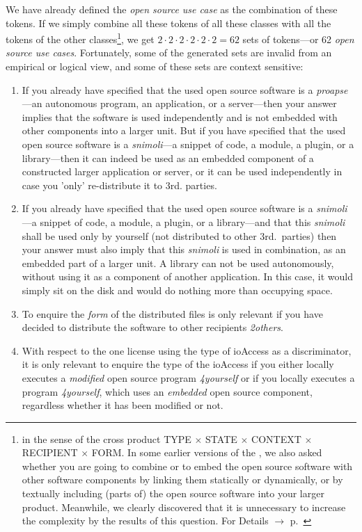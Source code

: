 We have already defined the \emph{open source use case} as the combination of
these tokens. If we simply combine all these tokens of all these classes with
all the tokens of the other classes\footnote{in the sense of the cross product
TYPE $\times$ STATE $\times$ CONTEXT $\times$ RECIPIENT $\times$ FORM. In some
earlier versions of the \oslic{}, we also asked whether you are going to combine
or to embed the open source software with other software components by linking
them statically or dynamically, or by textually including (parts of) the open
source software into your larger product. Meanwhile, we clearly discovered that
it is unnecessary to increase the complexity by the results of this question.
For Details $\rightarrow$ \oslic{} p.\ \pageref{sec:LinkingSecondary}}, we get
$2 \cdot 2 \cdot 2 \cdot 2 \cdot 2 \cdot 2 = 62$ sets of tokens---or 62
\emph{open source use cases}. Fortunately, some of the generated sets are
invalid from an empirical or logical view, and some of these sets are context
sensitive:

\begin{enumerate}
  \label{InvalidFinderTokenCombinations}
  \item If you already have specified that the used open source software is a
  \emph{proapse}---an autonomous program, an application, or a server---then
  your answer implies that the software is used independently and is not
  embedded with other components into a larger unit. But if you have specified
  that the used open source software is a \emph{snimoli}---a snippet of
  code, a module, a plugin, or a library---then it can indeed be used as an
  embedded component of a constructed larger application or server, or it can be
  used independently in case you 'only' re-distribute it to 3rd. parties.
  
  \item If you already have specified that the used open source software is a
  \emph{snimoli}---a snippet of code, a module, a plugin, or a library---and
  that this \emph{snimoli} shall be used only by yourself (not distributed to
  other 3rd.\ parties) then your answer must also imply that this \emph{snimoli}
  is used in combination, as an embedded part of a larger unit. A library can
  not be used autonomously, without using it as a component of another
  application. In this case, it would simply sit on the disk and would do
  nothing more than occupying space.
  
  \item To enquire the \emph{form} of the distributed files is only relevant if
  you have decided to distribute the software to other recipients
  \emph{2others}.
  
  \item With respect to the one license using the type of ioAccess as a
  discriminator, it is only relevant to enquire the type of the ioAccess if you
  either locally executes a \emph{modified} open source program \emph{4yourself}
  or if you locally executes a program \emph{4yourself}, which uses an
  \emph{embedded} open source component, regardless whether it has been modified
  or not.
  
\end{enumerate}

